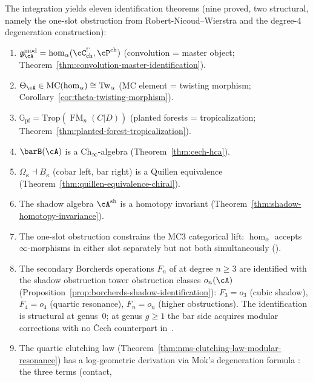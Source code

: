 \begin{remark}
\label{rem:three-pillar-identifications}
The integration yields eleven identification theorems (nine proved,
two structural, namely the one-slot obstruction from
Robert-Nicoud--Wierstra and the degree-$4$ degeneration construction):
\begin{enumerate}[label=\textup{(\arabic*)}]
\item $\mathfrak{g}_\cA^{\mathrm{mod}} =
 \operatorname{hom}_\alpha(\cC^{\textup{!\textasciigrave}}_{\mathrm{ch}},
 \cP^{\mathrm{ch}})$ (convolution = master object;
 Theorem~\ref{thm:convolution-master-identification}).
\item $\Theta_\cA \in \mathrm{MC}(\operatorname{hom}_\alpha)
 \cong \mathrm{Tw}_\alpha$ (MC element = twisting morphism;
 Corollary~\ref{cor:theta-twisting-morphism}).
\item $\mathbb{G}_{\mathrm{pf}} =
 \mathrm{Trop}(\overline{\operatorname{FM}}_n(C|D))$
 (planted forests = tropicalization;
 Theorem~\ref{thm:planted-forest-tropicalization}).
\item $\barB(\cA)$ is a $\mathrm{Ch}_\infty$-algebra
 (Theorem~\ref{thm:cech-hca}).
\item $\Omega_\kappa \dashv B_\kappa$ \textup{(}cobar left, bar
 right\textup{)} is a Quillen equivalence
 (Theorem~\ref{thm:quillen-equivalence-chiral}).
\item The shadow algebra $\cA^{\mathrm{sh}}$ is a homotopy invariant
 (Theorem~\ref{thm:shadow-homotopy-invariance}).
\item The one-slot obstruction constrains the MC3 categorical lift:
 $\operatorname{hom}_\alpha$ accepts $\infty$-morphisms in either slot
 separately but not both simultaneously
 (\cite[Theorem~6.6]{RNW19}).
\item The secondary Borcherds operations $F_n$ of \cite{MS24} at
 degree $n \geq 3$ are identified with the shadow obstruction tower obstruction
 classes $o_n(\cA)$
 (Proposition~\ref{prop:borcherds-shadow-identification}):
 $F_3 = o_3$ (cubic shadow), $F_4 = o_4$ (quartic resonance),
 $F_n = o_n$ (higher obstructions). The identification is
 structural at genus~$0$; at genus $g \geq 1$ the bar side
 acquires modular corrections with no \v{C}ech counterpart
 in~\cite{MS24}.
\item The quartic clutching law
 (Theorem~\ref{thm:nms-clutching-law-modular-resonance}) has a
 log-geometric derivation via Mok's degeneration formula
 \cite[Corollary~5.3.4]{Mok25}: the three terms (contact,

\end{enumerate}
\end{remark}
